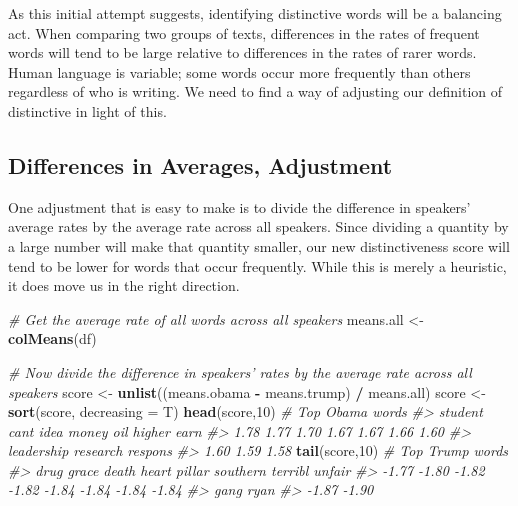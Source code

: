 \documentclass[
]{book}
\newenvironment{Shaded}{\begin{snugshade}}{\end{snugshade}}
\newcommand{\CommentTok}[1]{\textcolor[rgb]{0.56,0.35,0.01}{\textit{#1}}}
\newcommand{\DataTypeTok}[1]{\textcolor[rgb]{0.13,0.29,0.53}{#1}}
\newcommand{\DecValTok}[1]{\textcolor[rgb]{0.00,0.00,0.81}{#1}}
\newcommand{\KeywordTok}[1]{\textcolor[rgb]{0.13,0.29,0.53}{\textbf{#1}}}
\newcommand{\NormalTok}[1]{#1}
\newcommand{\OperatorTok}[1]{\textcolor[rgb]{0.81,0.36,0.00}{\textbf{#1}}}
\newcommand{\StringTok}[1]{\textcolor[rgb]{0.31,0.60,0.02}{#1}}
\begin{document}
As this initial attempt suggests, identifying distinctive words will be a balancing act. When comparing two groups of texts, differences in the rates of frequent words will tend to be large relative to differences in the rates of rarer words. Human language is variable; some words occur more frequently than others regardless of who is writing. We need to find a way of adjusting our definition of distinctive in light of this.

\hypertarget{differences-in-averages-adjustment}{%
\subsection{Differences in Averages, Adjustment}\label{differences-in-averages-adjustment}}

One adjustment that is easy to make is to divide the difference in speakers' average rates by the average rate across all speakers. Since dividing a quantity by a large number will make that quantity smaller, our new distinctiveness score will tend to be lower for words that occur frequently. While this is merely a heuristic, it does move us in the right direction.

\begin{Shaded}
\begin{Highlighting}[]
\CommentTok{# Get the average rate of all words across all speakers}
\NormalTok{means.all <-}\StringTok{ }\KeywordTok{colMeans}\NormalTok{(df)}

\CommentTok{# Now divide the difference in speakers' rates by the average rate across all speakers}
\NormalTok{score <-}\StringTok{ }\KeywordTok{unlist}\NormalTok{((means.obama }\OperatorTok{-}\StringTok{ }\NormalTok{means.trump) }\OperatorTok{/}\StringTok{ }\NormalTok{means.all)}
\NormalTok{score <-}\StringTok{ }\KeywordTok{sort}\NormalTok{(score, }\DataTypeTok{decreasing =}\NormalTok{ T)}
\KeywordTok{head}\NormalTok{(score,}\DecValTok{10}\NormalTok{) }\CommentTok{# Top Obama words}
\CommentTok{#>    student       cant       idea      money        oil     higher       earn }
\CommentTok{#>       1.78       1.77       1.70       1.67       1.67       1.66       1.60 }
\CommentTok{#> leadership   research    respons }
\CommentTok{#>       1.60       1.59       1.58}
\KeywordTok{tail}\NormalTok{(score,}\DecValTok{10}\NormalTok{) }\CommentTok{# Top Trump words}
\CommentTok{#>     drug    grace    death    heart   pillar southern  terribl   unfair }
\CommentTok{#>    -1.77    -1.80    -1.82    -1.82    -1.84    -1.84    -1.84    -1.84 }
\CommentTok{#>     gang     ryan }
\CommentTok{#>    -1.87    -1.90}
\end{Highlighting}
\end{Shaded}
\end{document}
